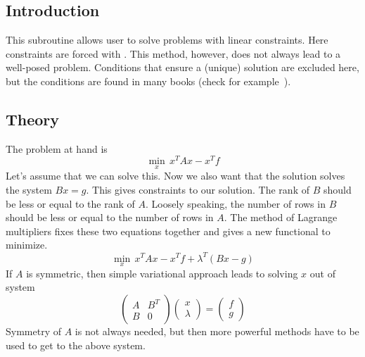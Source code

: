 \chapter{}
\noindent
{}
\begin{versiona}

\section{Introduction}
This subroutine allows user to solve problems with linear constraints.
Here constraints are forced with . This method,
however, does not always lead to a well-posed problem. Conditions that ensure
a (unique) solution are excluded here, but the conditions are found in many
books (check for example~\cite{c:girault}).  

\section{Theory}
The problem at hand is
\begin{equation}\label{e:problem}
\min_x \, x^T A x - x^T f
\end{equation}
Let's assume that we can solve this. Now we also want that the solution
solves the system $Bx = g$. This gives constraints to our solution.
The rank of $B$ should be less or equal to the rank of $A$.
Loosely speaking, the number of rows in $B$ should be less or equal to the
number of rows in $A$. The method of Lagrange multipliers fixes these two
equations together and gives a new functional to minimize.
\begin{equation}
\min_x \, x^T A x - x^T f +\lambda^T ( Bx-g )
\end{equation}
If $A$ is symmetric, then simple variational approach leads to solving
$x$ out of system
\begin{equation}
\begin{pmatrix}
A & B^T \\
B & 0 
\end{pmatrix} 
\begin{pmatrix}
x \\
\lambda
\end{pmatrix}
=
\begin{pmatrix}
f \\
g
\end{pmatrix}
\end{equation}
Symmetry of $A$ is not always needed, but then more powerful methods have to be used
to get to the above system.


\end{versiona}
